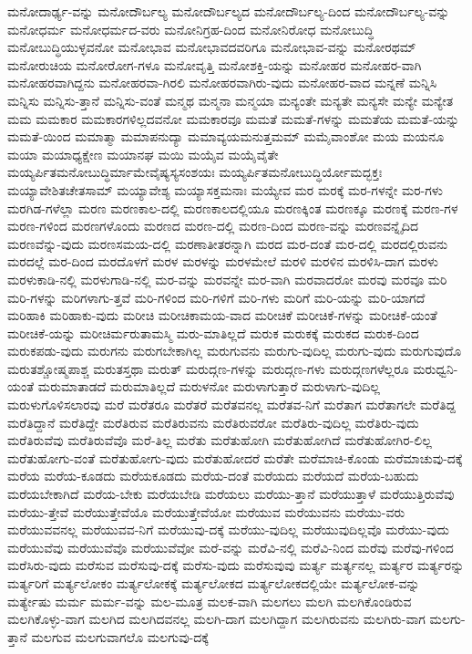 {ಮನೋದಾರ್ಢ್ಯ-ವನ್ನು
ಮನೋದೌರ್ಬಲ್ಯ
ಮನೋದೌರ್ಬಲ್ಯದ
ಮನೋದೌರ್ಬಲ್ಯ-ದಿಂದ
ಮನೋದೌರ್ಬಲ್ಯ-ವನ್ನು
ಮನೋಧರ್ಮ
ಮನೋಧರ್ಮದ-ವರು
ಮನೋನಿಗ್ರಹ-ದಿಂದ
ಮನೋನಿರೋಧ
ಮನೋಬುದ್ಧಿ
ಮನೋಬುದ್ಧಿಯುಳ್ಳವನೋ
ಮನೋಭಾವ
ಮನೋಭಾವದವರಿಗೂ
ಮನೋಭಾವ-ವನ್ನು
ಮನೋರಥಮ್
ಮನೋರುಚಿಯ
ಮನೋರೋಗ-ಗಳೂ
ಮನೋವೃತ್ತಿ
ಮನೋಶಕ್ತಿ-ಯನ್ನು
ಮನೋಹರ
ಮನೋಹರ-ವಾಗಿ
ಮನೋಹರವಾಗಿದ್ದನು
ಮನೋಹರವಾ-ಗಿರಲಿ
ಮನೋಹರವಾಗಿರು-ವುದು
ಮನೋಹರ-ವಾದ
ಮನ್ನಣೆ
ಮನ್ನಿಸಿ
ಮನ್ನಿಸು
ಮನ್ನಿಸು-ತ್ತಾನೆ
ಮನ್ನಿಸು-ವಂತೆ
ಮನ್ಮಥ
ಮನ್ಮನಾ
ಮನ್ಮಯಾ
ಮನ್ಯಂತೇ
ಮನ್ಯತೇ
ಮನ್ಯಸೇ
ಮನ್ಯೇ
ಮನ್ಯೇತ
ಮಮ
ಮಮಕಾರ
ಮಮಕಾರಗಳಿಲ್ಲದವನೋ
ಮಮಕಾರವೂ
ಮಮತೆ
ಮಮತೆ-ಗಳನ್ನು
ಮಮತೆಯ
ಮಮತೆ-ಯನ್ನು
ಮಮತೆ-ಯಿಂದ
ಮಮಾತ್ಮಾ
ಮಮಾಪನುದ್ಯಾ
ಮಮಾವ್ಯಯಮನುತ್ತಮಮ್
ಮಮೈವಾಂಶೋ
ಮಯ
ಮಯನೂ
ಮಯಾ
ಮಯಾಧ್ಯಕ್ಷೇಣ
ಮಯಾನಘ
ಮಯಿ
ಮಯೈವ
ಮಯೈವೈತೇ
ಮಯ್ಯರ್ಪಿತಮನೋಬುದ್ಧಿರ್ಮಾಮೇವೈಷ್ಯಸ್ಯಸಂಶಯಃ
ಮಯ್ಯರ್ಪಿತಮನೋಬುದ್ಧಿರ್ಯೋಮದ್ಭಕ್ತಃ
ಮಯ್ಯಾವೇಶಿತಚೇತಸಾಮ್
ಮಯ್ಯಾವೇಶ್ಯ
ಮಯ್ಯಾಸಕ್ತಮನಾಃ
ಮಯ್ಯೇವ
ಮರ
ಮರಕ್ಕೆ
ಮರ-ಗಳನ್ನೇ
ಮರ-ಗಳು
ಮರಗಿಡ-ಗಳೆಲ್ಲಾ
ಮರಣ
ಮರಣಕಾಲ-ದಲ್ಲಿ
ಮರಣಕಾಲದಲ್ಲಿಯೂ
ಮರಣಕ್ಕಿಂತ
ಮರಣಕ್ಕೂ
ಮರಣಕ್ಕೆ
ಮರಣ-ಗಳ
ಮರಣ-ಗಳಿಂದ
ಮರಣಗಳೊಂದು
ಮರಣದ
ಮರಣ-ದಲ್ಲಿ
ಮರಣ-ದಿಂದ
ಮರಣ-ವನ್ನು
ಮರಣವನ್ನೈದಿದ
ಮರಣವೆನ್ನು-ವುದು
ಮರಣಸಮಯ-ದಲ್ಲಿ
ಮರಣಾತೀತರನ್ನಾಗಿ
ಮರದ
ಮರ-ದಂತೆ
ಮರ-ದಲ್ಲಿ
ಮರದಲ್ಲಿರುವನು
ಮರದಲ್ಲೆ
ಮರ-ದಿಂದ
ಮರದೊಳಗೆ
ಮರಳ
ಮರಳನ್ನು
ಮರಳಮೇಲೆ
ಮರಳಿ
ಮರಳಿನ
ಮರಳಿಸಿ-ದಾಗ
ಮರಳು
ಮರಳುಕಾಡಿ-ನಲ್ಲಿ
ಮರಳುಗಾಡಿ-ನಲ್ಲಿ
ಮರ-ವನ್ನು
ಮರವನ್ನೇ
ಮರ-ವಾಗಿ
ಮರವಾದರೋ
ಮರವು
ಮರವೂ
ಮರಿ
ಮರಿ-ಗಳನ್ನು
ಮರಿಗಳಾಗು-ತ್ತವೆ
ಮರಿ-ಗಳಿಂದ
ಮರಿ-ಗಳಿಗೆ
ಮರಿ-ಗಳು
ಮರಿಗೆ
ಮರಿ-ಯನ್ನು
ಮರಿ-ಯಾಗದೆ
ಮರಿಹಾಕಿ
ಮರಿಹಾಕು-ವುದು
ಮರೀಚಿ
ಮರೀಚಿಕಾಮಯ-ವಾದ
ಮರೀಚಿಕೆ
ಮರೀಚಿಕೆ-ಗಳನ್ನು
ಮರೀಚಿಕೆ-ಯಂತೆ
ಮರೀಚಿಕೆ-ಯನ್ನು
ಮರೀಚಿರ್ಮರುತಾಮಸ್ಮಿ
ಮರು-ಮಾತಿಲ್ಲದೆ
ಮರುಕ
ಮರುಕಕ್ಕೆ
ಮರುಕದ
ಮರುಕ-ದಿಂದ
ಮರುಕಪಡು-ವುದು
ಮರುಗನು
ಮರುಗಬೇಕಾಗಿಲ್ಲ
ಮರುಗುವನು
ಮರುಗು-ವುದಿಲ್ಲ
ಮರುಗು-ವುದು
ಮರುಗುವುದೊ
ಮರುತಶ್ಚೋಷ್ಮಪಾಶ್ಚ
ಮರುತಸ್ತಥಾ
ಮರುತ್
ಮರುದ್ಗಣ-ಗಳನ್ನು
ಮರುದ್ಗಣ-ಗಳು
ಮರುದ್ಗಣಗಳೆಲ್ಲರೂ
ಮರುಧ್ವನಿ-ಯಂತೆ
ಮರುಮಾತಾಡದೆ
ಮರುಮಾತಿಲ್ಲದೆ
ಮರುಳನೋ
ಮರುಳಾಗುತ್ತಾರೆ
ಮರುಳಾಗು-ವುದಿಲ್ಲ
ಮರುಳುಗೊಳಿಸಲಾರವು
ಮರೆ
ಮರೆತರೂ
ಮರೆತರೆ
ಮರೆತವನಲ್ಲ
ಮರೆತವ-ನಿಗೆ
ಮರೆತಾಗ
ಮರೆತಾಗಲೇ
ಮರೆತಿದ್ದ
ಮರೆತಿದ್ದಾನೆ
ಮರೆತಿದ್ದೇ
ಮರೆತಿರುವ
ಮರೆತಿರುವನು
ಮರೆತಿರುವರೋ
ಮರೆತಿರು-ವುದಿಲ್ಲ
ಮರೆತಿರು-ವುದು
ಮರೆತಿರುವೆವು
ಮರೆತಿರುವೆವೊ
ಮರೆ-ತಿಲ್ಲ
ಮರೆತು
ಮರೆತುಹೋಗಿ
ಮರೆತುಹೋಗಿದೆ
ಮರೆತುಹೋಗಿರ-ಲಿಲ್ಲ
ಮರೆತುಹೋಗು-ವಂತೆ
ಮರೆತುಹೋಗು-ವುದು
ಮರೆತುಹೋದರೆ
ಮರೆತೇ
ಮರೆಮಾಚಿ-ಕೊಂಡು
ಮರೆಮಾಚುವು-ದಕ್ಕೆ
ಮರೆಯ
ಮರೆಯ-ಕೂಡದು
ಮರೆಯಕೂಡದು
ಮರೆಯ-ದಂತೆ
ಮರೆಯದು
ಮರೆಯದೆ
ಮರೆಯ-ಬಹುದು
ಮರೆಯಬೇಕಾಗಿದೆ
ಮರೆಯ-ಬೇಕು
ಮರೆಯಬೇಡಿ
ಮರೆಯಲು
ಮರೆಯು-ತ್ತಾನೆ
ಮರೆಯುತ್ತಾಳೆ
ಮರೆಯುತ್ತಿರುವೆವು
ಮರೆಯು-ತ್ತೇವೆ
ಮರೆಯುತ್ತೇವೆಯೊ
ಮರೆಯುತ್ತೇವೆಯೋ
ಮರೆಯುವ
ಮರೆಯುವನು
ಮರೆಯು-ವರು
ಮರೆಯುವವನಲ್ಲ
ಮರೆಯುವವ-ನಿಗೆ
ಮರೆಯುವು-ದಕ್ಕೆ
ಮರೆಯು-ವುದಿಲ್ಲ
ಮರೆಯುವುದಿಲ್ಲವೊ
ಮರೆಯು-ವುದು
ಮರೆಯುವೆವು
ಮರೆಯುವೆವೊ
ಮರೆಯುವೆವೋ
ಮರೆ-ವನ್ನು
ಮರೆವಿ-ನಲ್ಲಿ
ಮರೆವಿ-ನಿಂದ
ಮರೆವು
ಮರೆವು-ಗಳಿಂದ
ಮರೆಸಿರು-ವುದು
ಮರೆಸುವ
ಮರೆಸುವು-ದಕ್ಕೆ
ಮರೆಸು-ವುದು
ಮರೆಸುವುವು
ಮರ್ತ್ಯ
ಮರ್ತ್ಯನಲ್ಲ
ಮರ್ತ್ಯರ
ಮರ್ತ್ಯರನ್ನು
ಮರ್ತ್ಯರಿಗೆ
ಮರ್ತ್ಯಲೋಕಂ
ಮರ್ತ್ಯಲೋಕಕ್ಕೆ
ಮರ್ತ್ಯಲೋಕದ
ಮರ್ತ್ಯಲೋಕದಲ್ಲಿಯೇ
ಮರ್ತ್ಯಲೋಕ-ವನ್ನು
ಮರ್ತ್ಯೇಷು
ಮರ್ಮ
ಮರ್ಮ-ವನ್ನು
ಮಲ-ಮೂತ್ರ
ಮಲಕ-ವಾಗಿ
ಮಲಗಲು
ಮಲಗಿ
ಮಲಗಿಕೊಂಡಿರುವ
ಮಲಗಿಕೊಳ್ಳು-ವಾಗ
ಮಲಗಿದ
ಮಲಗಿದವನಲ್ಲ
ಮಲಗಿ-ದಾಗ
ಮಲಗಿದ್ದಾಗ
ಮಲಗಿರುವನು
ಮಲಗಿರು-ವಾಗ
ಮಲಗು-ತ್ತಾನೆ
ಮಲಗುವ
ಮಲಗುವಾಗಲೊ
ಮಲಗುವು-ದಕ್ಕೆ
}
